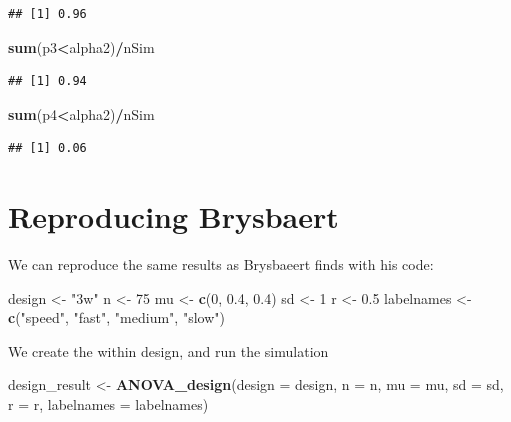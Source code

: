 \documentclass[]{book}
\newenvironment{Shaded}{\begin{snugshade}}{\end{snugshade}}
\newcommand{\DataTypeTok}[1]{\textcolor[rgb]{0.13,0.29,0.53}{#1}}
\newcommand{\DecValTok}[1]{\textcolor[rgb]{0.00,0.00,0.81}{#1}}
\newcommand{\FloatTok}[1]{\textcolor[rgb]{0.00,0.00,0.81}{#1}}
\newcommand{\KeywordTok}[1]{\textcolor[rgb]{0.13,0.29,0.53}{\textbf{#1}}}
\newcommand{\NormalTok}[1]{#1}
\newcommand{\OperatorTok}[1]{\textcolor[rgb]{0.81,0.36,0.00}{\textbf{#1}}}
\newcommand{\StringTok}[1]{\textcolor[rgb]{0.31,0.60,0.02}{#1}}
\begin{document}
\begin{verbatim}
## [1] 0.96
\end{verbatim}

\begin{Shaded}
\begin{Highlighting}[]
\KeywordTok{sum}\NormalTok{(p3}\OperatorTok{<}\NormalTok{alpha2)}\OperatorTok{/}\NormalTok{nSim}
\end{Highlighting}
\end{Shaded}

\begin{verbatim}
## [1] 0.94
\end{verbatim}

\begin{Shaded}
\begin{Highlighting}[]
\KeywordTok{sum}\NormalTok{(p4}\OperatorTok{<}\NormalTok{alpha2)}\OperatorTok{/}\NormalTok{nSim}
\end{Highlighting}
\end{Shaded}

\begin{verbatim}
## [1] 0.06
\end{verbatim}

\hypertarget{reproducing-brysbaert}{%
\section{Reproducing Brysbaert}\label{reproducing-brysbaert}}

We can reproduce the same results as Brysbaeert finds with his code:

\begin{Shaded}
\begin{Highlighting}[]
\NormalTok{design <-}\StringTok{ "3w"}
\NormalTok{n <-}\StringTok{ }\DecValTok{75}
\NormalTok{mu <-}\StringTok{ }\KeywordTok{c}\NormalTok{(}\DecValTok{0}\NormalTok{, }\FloatTok{0.4}\NormalTok{, }\FloatTok{0.4}\NormalTok{)}
\NormalTok{sd <-}\StringTok{ }\DecValTok{1}
\NormalTok{r <-}\StringTok{ }\FloatTok{0.5}
\NormalTok{labelnames <-}\StringTok{ }\KeywordTok{c}\NormalTok{(}\StringTok{"speed"}\NormalTok{, }\StringTok{"fast"}\NormalTok{, }\StringTok{"medium"}\NormalTok{, }\StringTok{"slow"}\NormalTok{)}
\end{Highlighting}
\end{Shaded}

We create the within design, and run the simulation

\begin{Shaded}
\begin{Highlighting}[]
\NormalTok{design_result <-}\StringTok{ }\KeywordTok{ANOVA_design}\NormalTok{(}\DataTypeTok{design =}\NormalTok{ design,}
                   \DataTypeTok{n =}\NormalTok{ n, }
                   \DataTypeTok{mu =}\NormalTok{ mu, }
                   \DataTypeTok{sd =}\NormalTok{ sd, }
                   \DataTypeTok{r =}\NormalTok{ r, }
                   \DataTypeTok{labelnames =}\NormalTok{ labelnames)}
\end{Highlighting}
\end{Shaded}
\end{document}
